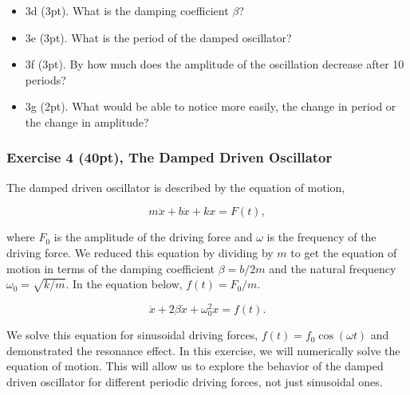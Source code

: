 \documentclass[11pt]{article}
\begin{document}
\begin{itemize}
\item
  3d (3pt). What is the damping coefficient \(\beta\)?
\item
  3e (3pt). What is the period of the damped oscillator?
\item
  3f (3pt). By how much does the amplitude of the oscillation decrease
  after 10 periods?
\item
  3g (2pt). What would be able to notice more easily, the change in
  period or the change in amplitude?
\end{itemize}

    \subsubsection{Exercise 4 (40pt), The Damped Driven
Oscillator}\label{exercise-4-40pt-the-damped-driven-oscillator}

The damped driven oscillator is described by the equation of motion,

\[m\ddot{x} + b\dot{x} + kx = F(t),\]

where \(F_0\) is the amplitude of the driving force and \(\omega\) is
the frequency of the driving force. We reduced this equation by dividing
by \(m\) to get the equation of motion in terms of the damping
coefficient \(\beta = b/2m\) and the natural frequency
\(\omega_0 = \sqrt{k/m}\). In the equation below, \(f(t) = F_0/m\).

\[\ddot{x} + 2\beta\dot{x} + \omega_0^2x = f(t).\]

We solve this equation for sinusoidal driving forces,
\(f(t) = f_0\cos(\omega t)\) and demonstrated the resonance effect. In
this exercise, we will numerically solve the equation of motion. This
will allow us to explore the behavior of the damped driven oscillator
for different periodic driving forces, not just sinusoidal ones.
\end{document}
